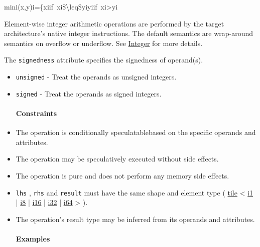 \documentclass{article}
\begin{document}
mini(x,y)i=\{xiif xi\$\textbackslash{}leq\$yiyiif xi>yi

Element-wise integer arithmetic operations are performed by the target architecture's native integer instructions. The default semantics are wrap-around semantics on overflow or underflow. See \href{https://docs.nvidia.com/cuda/tile-ir/latest/sections/operations.html#op-group-integer}{Integer} for more details.


The \texttt{signedness} attribute specifies the signedness of operand(s).


\begin{itemize}
\item \texttt{unsigned} - Treat the operands as unsigned integers.
\item \texttt{signed} - Treat the operands as signed integers.


\paragraph{Constraints}

\item The operation is conditionally speculatablebased on the specific operands and attributes.
\item The operation may be speculatively executed without side effects.
\item The operation is pure and does not perform any memory side effects.
\item \texttt{lhs} , \texttt{rhs} and \texttt{result} must have the same shape and element type ( \href{https://docs.nvidia.com/cuda/tile-ir/latest/sections/types.html#type-tile}{tile} < \href{https://docs.nvidia.com/cuda/tile-ir/latest/sections/types.html#subsection-element-types}{i1} | \href{https://docs.nvidia.com/cuda/tile-ir/latest/sections/types.html#subsection-element-types}{i8} | \href{https://docs.nvidia.com/cuda/tile-ir/latest/sections/types.html#subsection-element-types}{i16} | \href{https://docs.nvidia.com/cuda/tile-ir/latest/sections/types.html#subsection-element-types}{i32} | \href{https://docs.nvidia.com/cuda/tile-ir/latest/sections/types.html#subsection-element-types}{i64} > ).
\item The operation's result type may be inferred from its operands and attributes.


\paragraph{Examples}


\end{itemize}
\end{document}

